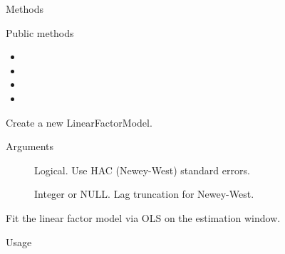 \documentclass[a4paper]{book}
\begin{document}
\begin{Section}{Methods}
%
\begin{SubSection}{Public methods}
\begin{itemize}

\item{} 
\item{} 
\item{} 
\item{} 

\end{itemize}

\end{SubSection}



\hypertarget{method-LinearFactorModel-initialize}{}
%
\begin{SubSection}{}
Create a new LinearFactorModel.
%

%
\begin{SubSubSection}{Arguments}

\begin{description}

\item[] Logical. Use HAC (Newey-West) standard errors.
\item[] Integer or NULL. Lag truncation for Newey-West.

\end{description}



\end{SubSubSection}

\end{SubSection}




\hypertarget{method-LinearFactorModel-fit}{}
%
\begin{SubSection}{}
Fit the linear factor model via OLS on the estimation window.
%
\begin{SubSubSection}{Usage}


\end{SubSubSection}
\end{SubSection}
\end{Section}
\end{document}
